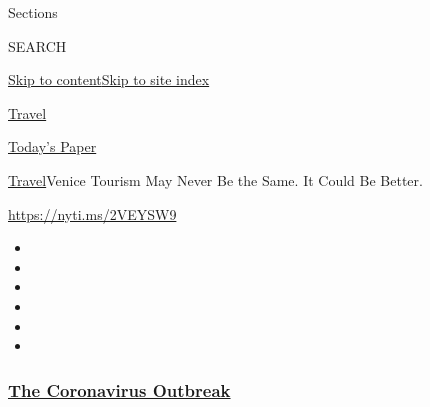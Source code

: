 Sections

SEARCH

\protect\hyperlink{site-content}{Skip to
content}\protect\hyperlink{site-index}{Skip to site index}

\href{https://www.nytimes3xbfgragh.onion/section/travel}{Travel}

\href{https://myaccount.nytimes3xbfgragh.onion/auth/login?response_type=cookie\&client_id=vi}{}

\href{https://www.nytimes3xbfgragh.onion/section/todayspaper}{Today's
Paper}

\href{/section/travel}{Travel}\textbar{}Venice Tourism May Never Be the
Same. It Could Be Better.

\url{https://nyti.ms/2VEYSW9}

\begin{itemize}
\item
\item
\item
\item
\item
\item
\end{itemize}

\hypertarget{the-coronavirus-outbreak}{%
\subsubsection{\texorpdfstring{\href{https://www.nytimes3xbfgragh.onion/news-event/coronavirus?name=styln-coronavirus-national\&region=TOP_BANNER\&variant=undefined\&block=storyline_menu_recirc\&action=click\&pgtype=Article\&impression_id=63cab970-e3b4-11ea-81b0-ed0ce085a510}{The
Coronavirus
Outbreak}}{The Coronavirus Outbreak}}\label{the-coronavirus-outbreak}}

